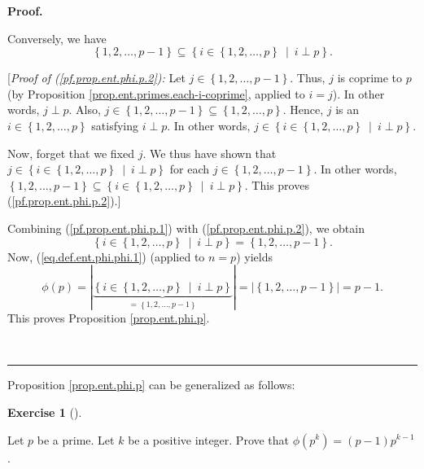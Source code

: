 \documentclass[numbers=enddot,12pt,final,onecolumn,notitlepage]{scrartcl}%
\newcounter{exer}
\numberwithin{exer}{subsection}
\theoremstyle{definition}
\newtheorem{exmp}[exer]{Exercise}
\newenvironment{exercise}[1][]
{\begin{exmp}[#1]\begin{leftbar}}
{\end{leftbar}\end{exmp}}
\newenvironment{fineprint}{\begin{small}}{\end{small}}
\newenvironment{proof}[1][Proof]{\noindent\textbf{#1.} }{\ \rule{0.5em}{0.5em}}
\begin{document}
\begin{proof}
\begin{fineprint}
Conversely, we have%
\begin{equation}
\left\{  1,2,\ldots,p-1\right\}  \subseteq\left\{  i\in\left\{  1,2,\ldots
,p\right\}  \ \mid\ i\perp p\right\}  . \label{pf.prop.ent.phi.p.2}%
\end{equation}


[\textit{Proof of (\ref{pf.prop.ent.phi.p.2}):} Let $j\in\left\{
1,2,\ldots,p-1\right\}  $. Thus, $j$ is coprime to $p$ (by Proposition
\ref{prop.ent.primes.each-i-coprime}, applied to $i=j$). In other words,
$j\perp p$. Also, $j\in\left\{  1,2,\ldots,p-1\right\}  \subseteq\left\{
1,2,\ldots,p\right\}  $. Hence, $j$ is an $i\in\left\{  1,2,\ldots,p\right\}
$ satisfying $i\perp p$. In other words, $j\in\left\{  i\in\left\{
1,2,\ldots,p\right\}  \ \mid\ i\perp p\right\}  $.

Now, forget that we fixed $j$. We thus have shown that $j\in\left\{
i\in\left\{  1,2,\ldots,p\right\}  \ \mid\ i\perp p\right\}  $ for each
$j\in\left\{  1,2,\ldots,p-1\right\}  $. In other words, $\left\{
1,2,\ldots,p-1\right\}  \subseteq\left\{  i\in\left\{  1,2,\ldots,p\right\}
\ \mid\ i\perp p\right\}  $. This proves (\ref{pf.prop.ent.phi.p.2}).]

Combining (\ref{pf.prop.ent.phi.p.1}) with (\ref{pf.prop.ent.phi.p.2}), we
obtain%
\[
\left\{  i\in\left\{  1,2,\ldots,p\right\}  \ \mid\ i\perp p\right\}
=\left\{  1,2,\ldots,p-1\right\}  .
\]
Now, (\ref{eq.def.ent.phi.phi.1}) (applied to $n=p$) yields%
\[
\phi\left(  p\right)  =\left\vert \underbrace{\left\{  i\in\left\{
1,2,\ldots,p\right\}  \ \mid\ i\perp p\right\}  }_{=\left\{  1,2,\ldots
,p-1\right\}  }\right\vert =\left\vert \left\{  1,2,\ldots,p-1\right\}
\right\vert =p-1.
\]
This proves Proposition \ref{prop.ent.phi.p}.
\end{fineprint}
\end{proof}

Proposition \ref{prop.ent.phi.p} can be generalized as follows:

\begin{exercise}
\label{exe.ent.phi.pk}Let $p$ be a prime. Let $k$ be a positive integer. Prove
that $\phi\left(  p^{k}\right)  =\left(  p-1\right)  p^{k-1}$.
\end{exercise}
\end{document}
